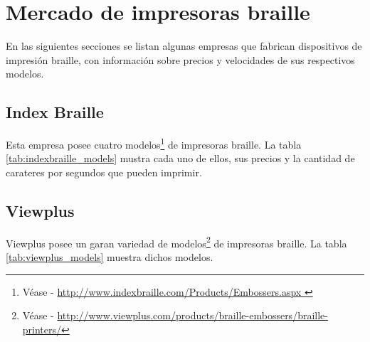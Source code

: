 \section{Mercado de impresoras braille}\label{cap:market}

En las siguientes secciones se listan algunas empresas que fabrican
dispositivos de impresi\'on braille, con informaci\'on sobre precios y
velocidades de sus respectivos modelos.

\subsection{Index Braille}
Esta empresa posee cuatro modelos\footnote{V\'ease
- \url{http://www.indexbraille.com/Products/Embossers.aspx }} de impresoras
braille. La tabla \ref{tab:indexbraille_models} mustra cada uno de ellos, sus
precios y la cantidad de carateres por segundos que pueden imprimir.

\begin{table}[ht]
\centering
{}
\caption{Modelos de \emph{INDEX BRAILLE}} 
\label{tab:indexbraille_models}
\end{table}


\clearpage
\subsection{Viewplus}
Viewplus posee un garan variedad de modelos\footnote{V\'ease - 
\url{http://www.viewplus.com/products/braille-embossers/braille-printers/}} de
impresoras braille. La tabla \ref{tab:viewplus_models} muestra dichos modelos.

